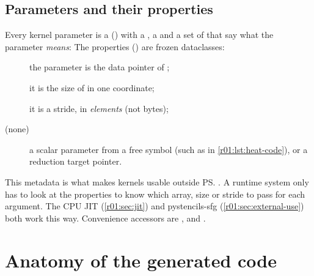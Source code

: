 \subsection{Parameters and their properties}

Every kernel parameter is a  () with a
, a  and a set of  that say what the parameter
\emph{means}:
The properties () are frozen dataclasses:
\begin{description}
  \item[] the parameter is the data pointer of ;
  \item[] it is the size of  in one
        coordinate;
  \item[] it is a stride, in \emph{elements} (not
        bytes);
  \item[(none)] a scalar parameter from a free symbol (such as  in
        \cref{r01:lst:heat-code}), or a reduction target pointer.
\end{description}
This metadata is what makes kernels usable outside \ps. A runtime system only has to
look at the properties to know which array, size or stride to pass for each argument.
The CPU JIT (\cref{r01:sec:jit}) and pystencils-sfg (\cref{r01:sec:external-use}) both work this
way. Convenience accessors are ,  and
.

\section{Anatomy of the generated code}\label{r01:sec:anatomy}

